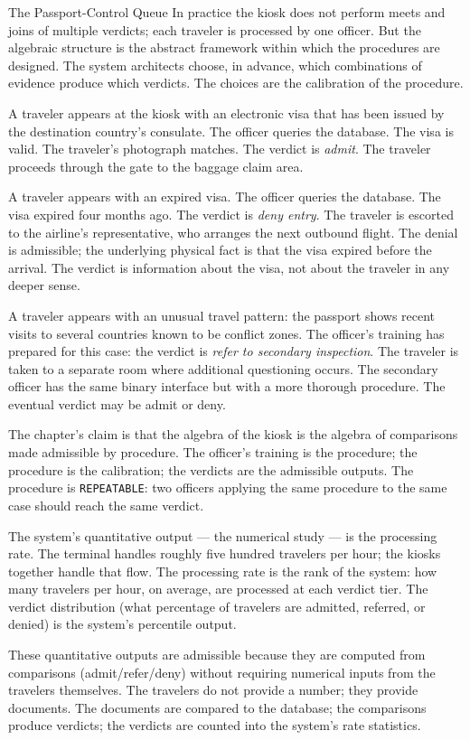 \begin{coda}{The Passport-Control Queue}
In practice the kiosk does not perform meets and joins of multiple
verdicts; each traveler is processed by one officer. But the
algebraic structure is the abstract framework within which the
procedures are designed. The system architects choose, in advance,
which combinations of evidence produce which verdicts. The choices
are the calibration of the procedure.

A traveler appears at the kiosk with an electronic visa that has been
issued by the destination country's consulate. The officer queries the
database. The visa is valid. The traveler's photograph matches. The
verdict is \emph{admit}. The traveler proceeds through the gate to
the baggage claim area.

A traveler appears with an expired visa. The officer queries the
database. The visa expired four months ago. The verdict is \emph{deny
entry}. The traveler is escorted to the airline's representative, who
arranges the next outbound flight. The denial is admissible; the
underlying physical fact is that the visa expired before the
arrival. The verdict is information about the visa, not about the
traveler in any deeper sense.

A traveler appears with an unusual travel pattern: the passport shows
recent visits to several countries known to be conflict zones. The
officer's training has prepared for this case: the verdict is
\emph{refer to secondary inspection}. The traveler is taken to a
separate room where additional questioning occurs. The secondary
officer has the same binary interface but with a more thorough
procedure. The eventual verdict may be admit or deny.

The chapter's claim is that the algebra of the kiosk is the
algebra of comparisons made admissible by procedure. The officer's
training is the procedure; the procedure is the calibration; the
verdicts are the admissible outputs. The procedure is
\texttt{REPEATABLE}: two officers applying the same procedure to
the same case should reach the same verdict.

The system's quantitative output --- the numerical study --- is the
processing rate. The terminal handles roughly five hundred
travelers per hour; the kiosks together handle that flow. The
processing rate is the rank of the system: how many travelers per
hour, on average, are processed at each verdict tier. The verdict
distribution (what percentage of travelers are admitted, referred,
or denied) is the system's percentile output.

These quantitative outputs are admissible because they are computed
from comparisons (admit/refer/deny) without requiring numerical
inputs from the travelers themselves. The travelers do not provide
a number; they provide documents. The documents are compared to
the database; the comparisons produce verdicts; the verdicts are
counted into the system's rate statistics.


\end{coda}
